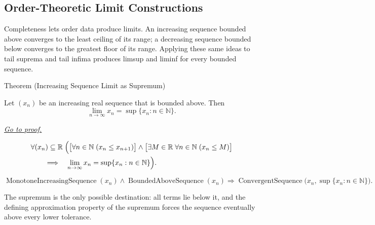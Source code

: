 \subsection*{Order-Theoretic Limit Constructions}
\begin{exposition}
Completeness lets order data produce limits. An increasing sequence bounded
above converges to the least ceiling of its range; a decreasing sequence
bounded below converges to the greatest floor of its range. Applying these
same ideas to tail suprema and tail infima produces limsup and liminf for
every bounded sequence.
\end{exposition}


\begin{theorembox}{Theorem (Increasing Sequence Limit as Supremum)}
\begin{theorem}
\label{thm:increasing-sequence-limit-as-supremum}
Let $(x_n)$ be an increasing real sequence that is bounded above. Then
\[
  \lim_{n\to\infty}x_n=\sup\{x_n:n\in\mathbb{N}\}.
\]

\smallskip
\noindent
\hyperref[prf:increasing-sequence-limit-as-supremum]{\textit{Go to proof.}}
\end{theorem}
\end{theorembox}

\begin{remark*}
\[
\begin{aligned}
&\forall (x_n)\subseteq\mathbb{R}\;
\Bigl(
  \bigl[\forall n\in\mathbb{N}\;(x_n\le x_{n+1})\bigr]
  \land
  \bigl[\exists M\in\mathbb{R}\;\forall n\in\mathbb{N}\;(x_n\le M)\bigr]\\
&\qquad\Longrightarrow\quad
  \lim_{n\to\infty}x_n=\sup\{x_n:n\in\mathbb{N}\}
\Bigr).
\end{aligned}
\]
\end{remark*}

\begin{remark*}
\[
\operatorname{MonotoneIncreasingSequence}(x_n)
\land
\operatorname{BoundedAboveSequence}(x_n)
\Longrightarrow
\operatorname{ConvergentSequence}\bigl(x_n,\sup\{x_n:n\in\mathbb{N}\}\bigr).
\]
\end{remark*}

\begin{remark*}[Interpretation]
The supremum is the only possible destination: all terms lie below it, and
the defining approximation property of the supremum forces the sequence
eventually above every lower tolerance.
\end{remark*}

